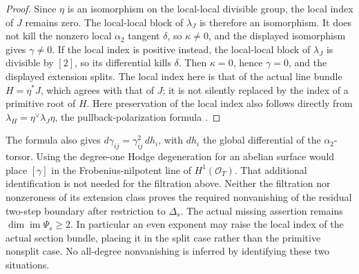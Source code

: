 \begin{proof}
Since \(\eta\) is an isomorphism on the local-local divisible group,
the local index of \(J\) remains zero. The local-local block of
\(\lambda_J\) is therefore an isomorphism. It does not kill the
nonzero local \(\alpha _2\) tangent \(\delta\), so \(\kappa\ne0\),
and the displayed isomorphism gives \(\gamma\ne0\).
If the local index is positive instead, the local-local block of
\(\lambda_J\) is divisible by \([2]\), so its differential kills
\(\delta\). Then \(\kappa=0\), hence \(\gamma=0\), and the displayed
extension splits. The local index here is that of the actual line
bundle \(H=\eta^*J\), which agrees with that of \(J\); it is not
silently replaced by the index of a primitive root of \(H\).
Here preservation of the local index also follows directly from
\(\lambda_H=\eta^\vee\lambda_J\eta\), the pullback-polarization formula
\cite[Proposition~7.6 and proof, p.~100]{EdixhovenVanDerGeerMoonenAV}.
\end{proof}

\begin{remark}
\label{rem:DE-A3-primitive-unipotent-scope-candidate}
The formula also gives \(d\gamma_{ij}=\gamma_{ij}^2\,dh_i\), with
\(dh_i\) the global differential of the \(\alpha _2\)-torsor.
Using the degree-one Hodge degeneration for an abelian surface would
place \([\gamma]\) in the Frobenius-nilpotent line of \(H^1(\mathcal O_T)\).
That additional identification is not needed for the filtration above.
Neither the filtration nor nonzeroness of its extension class proves
the required nonvanishing of the residual two-step boundary after
restriction to \(\Delta_s\). The actual missing assertion remains
\(\dim\operatorname{im}\Psi_s\ge2\).
In particular an even exponent may raise the local index of the actual
section bundle, placing it in the split case rather than the primitive
nonsplit case. No all-degree nonvanishing is inferred by identifying
these two situations.
\end{remark}
